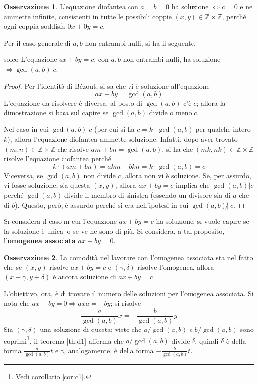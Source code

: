 \documentclass[11pt, a4paper]{scrartcl}
\theoremstyle{definition}
\numberwithin{esempio}{section}
\theoremstyle{definition}
\newtheorem{obs}{Osservazione}
\numberwithin{obs}{section}
\numberwithin{nota}{section}
\numberwithin{equation}{subsection}
\begin{document}
\begin{obs}
	L'equazione diofantea con $a=b=0$ ha soluzione $\iff c= 0$ e ne ammette infinite, consistenti in tutte le possibili coppie $(\overline{x},\overline{y}) \in \mathbb{Z}\times \mathbb{Z}$, perch\'e ogni coppia soddisfa $0 x + 0y = c$.
\end{obs}
Per il caso generale di $a,b$ non entrambi nulli, si ha il seguente.
\begin{teorema}
	{}{solco}
	L'equazione $ax + by = c$, con $a,b$ non entrambi nulli, ha soluzione $\iff \operatorname{gcd} (a,b )  | c$.
	\begin{proof}
		Per l'identit\`a di B\'ezout, si sa che vi \`e soluzione all'equazione 
		\[
		ax + by = \operatorname{gcd}(a,b) 
		\] 
		L'equazione da risolvere \`e diversa: al posto di $\operatorname{gcd}(a,b) $ c'\`e $c$; allora la dimostrazione si basa sul capire se $\operatorname{gcd}(a,b) $ divide o meno $c$.

		Nel caso in cui $\operatorname{gcd}(a,b) | c$ (per cui si ha $c = k\cdot \operatorname{gcd}(a,b) $ per qualche intero $k$), allora l'equazione diofantea ammette soluzione. Infatti, dopo aver trovato $(m,n) \in \mathbb{Z} \times \mathbb{Z}$ che risolve $am + bn = \operatorname{gcd}(a,b) $, si ha che $(m k , nk) \in \mathbb{Z} \times \mathbb{Z}$ risolve l'equazione diofantea perch\'e 
		\[
		k \cdot (am + bn ) = akm + bkn = k\cdot \operatorname{gcd}(a,b) = c
		\] 
		Viceversa, se $\operatorname{gcd}(a,b)$ non divide $c$, allora non vi \`e soluzione. Se, per assurdo, vi fosse soluzione, sia questa $(\overline{x},\overline{y})$, allora $a \overline{x}+ b \overline{y}=c$ implica che $\operatorname{gcd}(a,b) | c$ perch\'e $\operatorname{gcd}(a,b) $ divide il membro di sinistra (essendo un divisore sia di $a$ che di $b$). 
		Questo, per\`o, \`e assurdo perch\'e si era nell'ipotesi in cui $\operatorname{gcd}(a,b) \not | \ c$.
	\end{proof}
\end{teorema}
Si considera il caso in cui l'equazione $ax + by = c$ ha soluzione; si vuole capire se la soluzione \`e unica, o se ve ne sono di pi\`u. 
Si considera, a tal proposito, l'\textbf{omogenea associata} $ax + by = 0$. 
\begin{obs}
	La comodit\`a nel lavorare con l'omogenea associata sta nel fatto che se $(\overline{x}, \overline{y})$ risolve $ax + by = c$ e  $(\gamma, \delta )$ risolve l'omogenea, allora $(\overline{x}+\gamma, \overline{y}+\delta )$ \`e ancora soluzione di $ax + by = c$.
\end{obs}
\noindent L'obiettivo, ora, \`e di trovare il numero delle soluzioni per l'omogenea associata.
Si nota che $ax + by =0 \Rightarrow  axa = - by$; si risolve
\[
\frac{a}{\operatorname{gcd}(a,b) } x = - \frac{b}{\operatorname{gcd}(a,b) } y 
\] 
Sia $(\gamma, \delta )$ una soluzione di questa; visto che $a/\operatorname{gcd}(a,b) $ e $b / \operatorname{gcd}(a,b) $ sono coprimi\footnote{Vedi corollario \ref{cor:c1}.}, il teorema \ref{th:d1} afferma che $a / \operatorname{gcd}(a,b) $ divide $\delta $, quindi $\delta $ \`e della forma $\frac{a}{\operatorname{gcd}(a,b)}  t$ e $\gamma$, analogamente, \`e della forma $- \frac{b}{\operatorname{gcd}(a,b)} t$.
\end{document}
